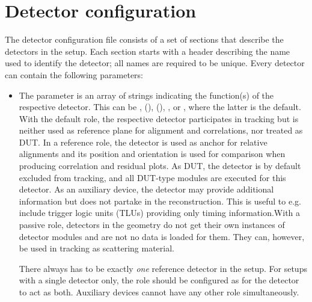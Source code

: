\section{Detector configuration}
\label{sec:detector_config}
The detector configuration file consists of a set of sections that describe the detectors in the setup.
Each section starts with a header describing the name used to identify the detector; all names are required to be unique.
Every detector can contain the following parameters:
\begin{itemize}
\item The  parameter is an array of strings indicating the function(s) of the respective detector. This can be ,  (),  (), , or , where the latter is the default. With the default role, the respective detector participates in tracking but is neither used as reference plane for alignment and correlations, nor treated as DUT. In a reference role, the detector is used as anchor for relative alignments and its position and orientation is used for comparison when producing correlation and residual plots. As DUT, the detector is by default excluded from tracking, and all DUT-type modules are executed for this detector. As an auxiliary device, the detector may provide additional information but does not partake in the reconstruction. This is useful to e.g. include trigger logic units (TLUs) providing only timing information.With a passive role, detectors in the geometry do not get their own instances of detector modules and are not no data is loaded for them. They can, however, be used in tracking as scattering material.
\begin{warning}
There always has to be exactly \emph{one} reference detector in the setup. For setups with a single detector only, the role should be configured as  for the detector to act as both. Auxiliary devices cannot have any other role simultaneously.
\end{warning}


\end{itemize}
